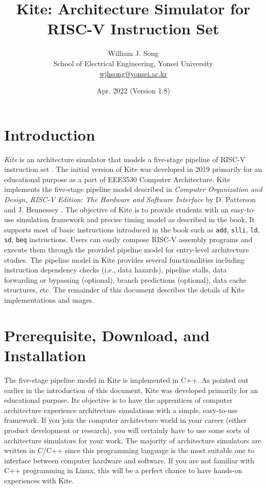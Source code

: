 \documentclass[10pt]{article}
\begin{document}
\title{Kite: Architecture Simulator for RISC-V Instruction Set}
\author{William J. Song\\
        School of Electrical Engineering, Yonsei University\\
        \href{mailto:wjhsong@yonsei.ac.kr}{wjhsong@yonsei.ac.kr}}
\date{Apr. 2022 (Version 1.8)}
\maketitle


\section{Introduction} \label{sec:introduction}
\emph{Kite} is an architecture simulator that models a five-stage pipeline of RISC-V instruction set \cite{waterman_riscv2019}.
The initial version of Kite was developed in 2019 primarily for an educational purpose as a part of EEE3530 Computer Architecture.
Kite implements the five-stage pipeline model described in \emph{Computer Organization and Design, RISC-V Edition: The Hardware and Software Interface} by D. Patterson and J. Hennessey \cite{patterson_morgan2017}.
The objective of Kite is to provide students with an easy-to-use simulation framework and precise timing model as described in the book.
It supports most of basic instructions introduced in the book such as {\tt add}, {\tt slli}, {\tt ld}, {\tt sd}, {\tt beq} instructions.
Users can easily compose RISC-V assembly programs and execute them through the provided pipeline model for entry-level architecture studies.
The pipeline model in Kite provides several functionalities including instruction dependency checks (i.e., data hazards), pipeline stalls, data forwarding or bypassing (optional), branch predictions (optional), data cache structures, etc.
The remainder of this document describes the details of Kite implementations and usages.


\section{Prerequisite, Download, and Installation} \label{sec:install}
The five-stage pipeline model in Kite is implemented in C++.
As pointed out earlier in the introduction of this document, Kite was developed primarily for an educational purpose.
Its objective is to have the apprentices of computer architecture experience architecture simulations with a simple, easy-to-use framework.
If you join the computer architecture world in your career (either product development or research), you will certainly have to use some sorts of architecture simulators for your work.
The majority of architecture simulators are written in C/C++ since this programming language is the most suitable one to interface between computer hardware and software.
If you are not familiar with C++ programming in Linux, this will be a perfect chance to have hands-on experiences with Kite.
\end{document}
